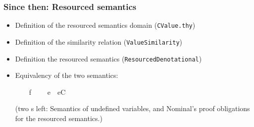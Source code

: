 \documentclass{beamer}
\begin{document}
\begin{frame}
\frametitle{Since then: Resourced semantics}

\begin{itemize}
\item Definition of the resourced semantics domain (\texttt{CValue.thy})
\item Definition of the similarity relation (\texttt{ValueSimilarity})
\item Definition the resourced semantics (\texttt{ResourcedDenotational})
\item Equivalency of the two semantics:
\begin{isabelle}
\ \ \ {\isachardoublequoteopen}{\isasymrho}\ f{\isasymtriangleleft}{\isasymtriangleright}\ {\isasymsigma}{\isachardoublequoteclose}\isanewline
\ \ \ {\isachardoublequoteopen}{\isasymlbrakk}e{\isasymrbrakk}\isactrlbsub {\isasymrho}\isactrlesub \ {\isasymtriangleleft}{\isasymtriangleright}\ {\isacharparenleft}{\isasymN}{\isasymlbrakk}e{\isasymrbrakk}\isactrlbsub {\isasymsigma}\isactrlesub {\isacharparenright}{\isasymcdot}{\isacharparenleft}C\isactrlsup {\isasyminfinity}{\isacharparenright}{\isachardoublequoteclose}
\end{isabelle}
(two s left: Semantics of undefined variables, and Nominal's proof obligations for the resourced semantics.)
\end{itemize}
\end{frame}
\end{document}
